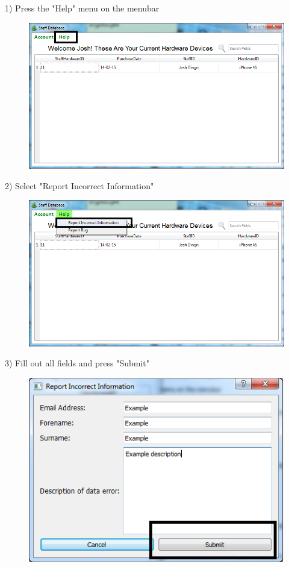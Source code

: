 1) Press the "Help" menu on the menubar

\begin{figure}[H]
    \includegraphics[width=\textwidth]{./Manual/Images/bugreport.png}
\end{figure}

2) Select "Report Incorrect Information"

\begin{figure}[H]
    \includegraphics[width=\textwidth]{./Manual/Images/errorreport.png}
\end{figure}

3) Fill out all fields and press "Submit"

\begin{figure}[H]
    \includegraphics[width=\textwidth]{./Manual/Images/errorreport2.png}
\end{figure}


